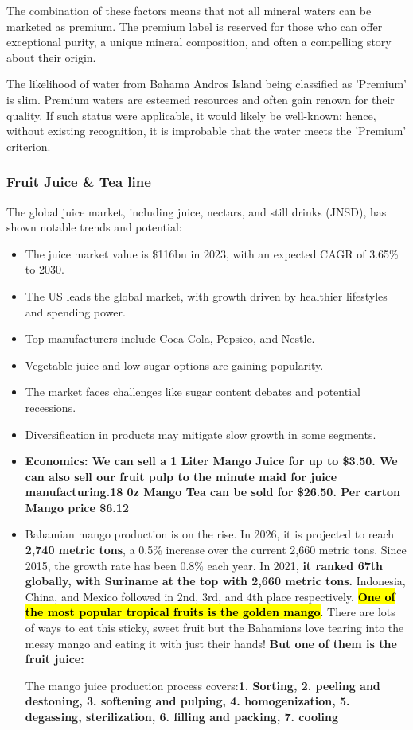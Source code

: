 \documentclass{article}
\begin{document}
The combination of these factors means that not all mineral waters can be marketed as premium. The premium label is reserved for those who can offer exceptional purity, a unique mineral composition, and often a compelling story about their origin.

The likelihood of water from Bahama Andros Island being classified as 'Premium' is slim. Premium waters are esteemed resources and often gain renown for their quality. If such status were applicable, it would likely be well-known; hence, without existing recognition, it is improbable that the water meets the 'Premium' criterion.

\subsubsection{Fruit Juice \& Tea line}
The global juice market, including juice, nectars, and still drinks (JNSD), has shown notable trends and potential:

\begin{itemize}
  \item The juice market value is \$116bn in 2023, with an expected CAGR of 3.65\% to 2030.
  \item The US leads the global market, with growth driven by healthier lifestyles and spending power.
  \item Top manufacturers include Coca-Cola, Pepsico, and Nestle.
  \item Vegetable juice and low-sugar options are gaining popularity.

  \item The market faces challenges like sugar content debates and potential recessions.
  \item Diversification in products may mitigate slow growth in some segments.
\end{itemize}


\begin{itemize}
    \item \textbf{Economics:
    We can sell a 1 Liter Mango Juice for up to \$3.50.
    We can also sell our fruit pulp to the minute maid for juice manufacturing.18 0z Mango Tea can be sold for \$26.50.
    Per carton Mango price \$6.12}
    
    \item Bahamian mango production is on the rise. In 2026, it is projected to reach \textbf{2,740 metric tons}, a 0.5\% increase over the current 2,660 metric tons. Since 2015, the growth rate has been 0.8\% each year. In 2021, \textbf{it ranked 67th globally, with Suriname at the top with 2,660 metric tons.} Indonesia, China, and Mexico followed in 2nd, 3rd, and 4th place respectively.
    \textbf{\hl{One of the most popular tropical fruits is the golden mango}}. There are lots of ways to eat this sticky, sweet fruit but the Bahamians love tearing into the messy mango and eating it with just their hands! \textbf{But one of them is the fruit juice:}\par
    The mango juice production process covers:\textbf{1. Sorting, 2. peeling and destoning, 3. softening and pulping, 4. homogenization, 5. degassing, sterilization, 6. filling and packing, 7. cooling}
\end{itemize}
\end{document}
